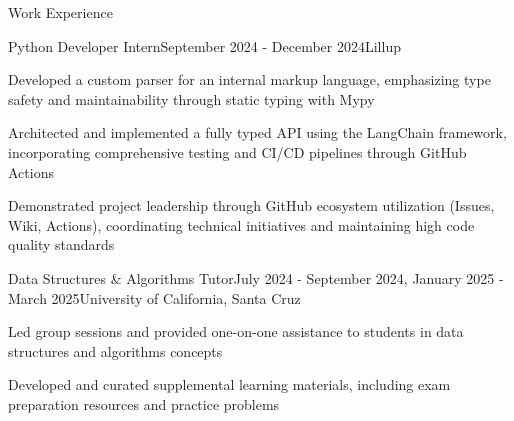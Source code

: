 \documentclass{resume}
\begin{document}
\begin{rSection}{Work Experience}

	\begin{rSubsection}{Python Developer Intern}{September 2024 - December 2024}{Lillup}{}
		\item Developed a custom parser for an internal markup language, emphasizing type safety and maintainability through static typing with Mypy
		\item Architected and implemented a fully typed API using the LangChain framework, incorporating comprehensive testing and CI/CD pipelines through GitHub Actions
		\item Demonstrated project leadership through GitHub ecosystem utilization (Issues, Wiki, Actions), coordinating technical initiatives and maintaining high code quality standards
	\end{rSubsection}

	\begin{rSubsection}{Data Structures \& Algorithms Tutor}{July 2024 - September 2024, January 2025 - March 2025}{University of California, Santa Cruz}{}
		\item Led group sessions and provided one-on-one assistance to students in data structures and algorithms concepts
		\item Developed and curated supplemental learning materials, including exam preparation resources and practice problems
	\end{rSubsection}

\end{rSection}
\end{document}

